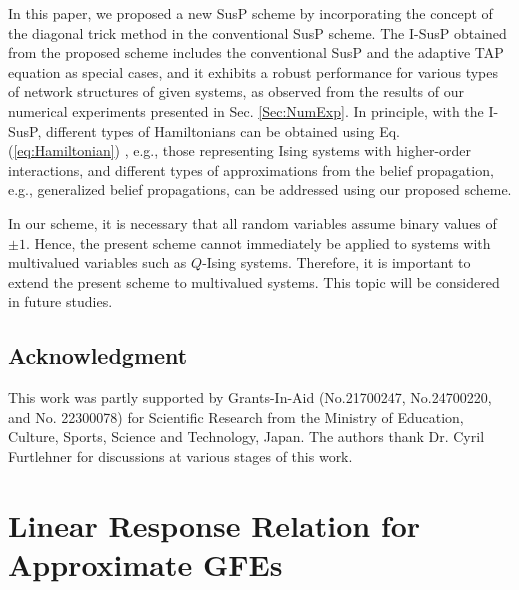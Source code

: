 \documentclass[%
 reprint,
 amsmath,amssymb,
 aps, 
 pre,
 showkeys
]{revtex4-1}
\begin{document}
In this paper, we proposed a new SusP scheme by incorporating the concept of the diagonal trick method in the conventional SusP scheme. 
The I-SusP obtained from the proposed scheme includes the conventional SusP and the adaptive TAP equation as special cases, 
and it exhibits a robust performance for various types of network structures of given systems, 
as observed from the results of our numerical experiments presented in Sec. \ref{Sec:NumExp}. 
In principle, with the I-SusP, different types of Hamiltonians can be obtained using Eq. (\ref{eq:Hamiltonian})
, e.g., those representing Ising systems with higher-order interactions, and 
different types of approximations from the belief propagation, e.g., generalized belief propagations, can be addressed using our proposed scheme. 

In our scheme, it is necessary that all random variables assume binary values of $\pm 1$. 
Hence, the present scheme cannot immediately be applied to systems with multivalued variables such as $Q$-Ising systems. 
Therefore, it is important to extend the present scheme to multivalued systems.
This topic will be considered in future studies.

\subsection*{Acknowledgment}
This work was partly supported by Grants-In-Aid (No.21700247, No.24700220, and No. 22300078) 
for Scientific Research from the Ministry of Education, Culture, Sports, Science and Technology, Japan.
The authors thank Dr. Cyril Furtlehner for discussions at various stages of this work. 



\appendix

\section{Linear Response Relation for Approximate GFEs}
\end{document}
